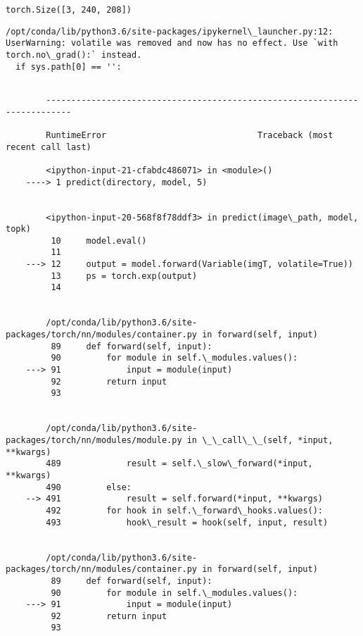 \documentclass[11pt]{article}
\begin{document}
    \begin{Verbatim}[commandchars=\\\{\}]
torch.Size([3, 240, 208])

    \end{Verbatim}

    \begin{Verbatim}[commandchars=\\\{\}]
/opt/conda/lib/python3.6/site-packages/ipykernel\_launcher.py:12: UserWarning: volatile was removed and now has no effect. Use `with torch.no\_grad():` instead.
  if sys.path[0] == '':

    \end{Verbatim}

    \begin{Verbatim}[commandchars=\\\{\}]

        ---------------------------------------------------------------------------

        RuntimeError                              Traceback (most recent call last)

        <ipython-input-21-cfabdc486071> in <module>()
    ----> 1 predict(directory, model, 5)
    

        <ipython-input-20-568f8f78ddf3> in predict(image\_path, model, topk)
         10     model.eval()
         11 
    ---> 12     output = model.forward(Variable(imgT, volatile=True))
         13     ps = torch.exp(output)
         14 


        /opt/conda/lib/python3.6/site-packages/torch/nn/modules/container.py in forward(self, input)
         89     def forward(self, input):
         90         for module in self.\_modules.values():
    ---> 91             input = module(input)
         92         return input
         93 


        /opt/conda/lib/python3.6/site-packages/torch/nn/modules/module.py in \_\_call\_\_(self, *input, **kwargs)
        489             result = self.\_slow\_forward(*input, **kwargs)
        490         else:
    --> 491             result = self.forward(*input, **kwargs)
        492         for hook in self.\_forward\_hooks.values():
        493             hook\_result = hook(self, input, result)


        /opt/conda/lib/python3.6/site-packages/torch/nn/modules/container.py in forward(self, input)
         89     def forward(self, input):
         90         for module in self.\_modules.values():
    ---> 91             input = module(input)
         92         return input
         93 



\end{Verbatim}
\end{document}
